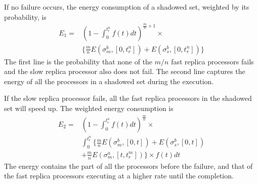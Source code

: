 If no failure occurs, the energy consumption of a shadowed set, weighted by its probability, is 
\begin{equation}
\begin{split}
E_1 = & (1-\int_{0}^{t_r^n} f(t)dt)^{\frac{m}{n}+1} \times \\
      & \{\frac{m}{n}E(\sigma_m^b,[0,t_r^n])+E(\sigma_s^b,[0,t_r^n])\}
\label{eq:energy_no_failure}
\end{split}
\end{equation}
The first line is the probability that none of the $m/n$ fast replica processors fails and the slow replica processor also does not fail. The second line captures the energy of all the processors in a shadowed set during the execution. 

If the slow replica processor fails, all the fast replica processors in the shadowed set will speed up. The weighted energy consumption is 
\begin{equation}
\begin{split}
E_2 = & (1-\int_{0}^{t_r^n} f(t)dt)^\frac{m}{n} \times \\
      & \int_{0}^{t_r^n} \{\frac{m}{n}E(\sigma_m^b, [0,t])+E(\sigma_s^b, [0,t]) \\       & +\frac{m}{n}E(\sigma_m^a, [t,t_r^m])\} \times f(t)dt
\end{split}
\end{equation}   
The energy contains the part of all the processors before the failure, and that of the fast replica processors executing at a higher rate until the completion. 

